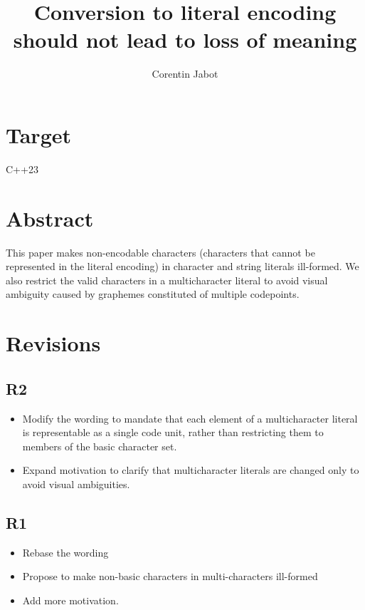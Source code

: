 \documentclass{wg21}
\title{Conversion to literal encoding should not lead to loss of meaning}
\author{Corentin Jabot}{corentin.jabot@gmail.com}
\begin{document}
    
    \maketitle
    
    
    \section{Target}
    
    C++23
    
    \section{Abstract}
    
    This paper makes non-encodable characters (characters that cannot be represented in the literal encoding) in character and string literals ill-formed. 
    We also restrict the valid characters in a multicharacter literal to avoid visual ambiguity caused by graphemes constituted of multiple codepoints.
    
    \section{Revisions}
    
    \subsection{R2}
    \begin{itemize}
        \item Modify the wording to mandate that each element of a multicharacter literal is representable as a single code unit,
        rather than restricting them to members of the basic character set. 
        \item Expand motivation to clarify that multicharacter literals are changed only to avoid visual ambiguities.
    \end{itemize}
    
    \subsection{R1}
    \begin{itemize}
        \item Rebase the wording
        \item Propose to make non-basic characters in multi-characters ill-formed
        \item Add more motivation.
    \end{itemize}
    
\end{document}
